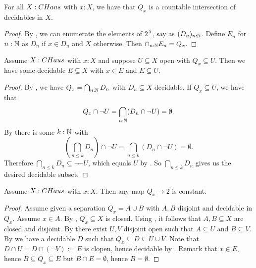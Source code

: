 \begin{lemma}\label{ConnectedComponentClosedInCompactHausdorff}
For all $X:\CHaus$ with $x:X$, we have that $Q_x$ is a countable intersection of decidables in $X$.
\end{lemma}
\begin{proof}
  By ,
  we can enumerate the elements of $2^X$, say as $(D_n)_{n:\mathbb{N}}$. 
  Define $E_n$ for $n:\mathbb{N}$ as $D_n$ if $x\in D_n$ and $X$ otherwise. 
  Then $\cap_{n:\mathbb{N}}E_n = Q_x$.
\end{proof}
%

\begin{lemma}\label{ConnectedComponentSubOpenHasDecidableInbetween}
  Assume $X:\Chaus$ with $x:X$ and suppose $U\subseteq X$ open with $Q_x\subseteq U$. 
  Then we have some decidable $E\subseteq X$ with $x\in E$ and $E\subseteq U$. 
\end{lemma}
\begin{proof}
  By , 
  we have $Q_x = \bigcap_{n:\mathbb{N}}D_n$ with $D_n\subseteq X$ decidable. 
  If $Q_x \subseteq U$, we have that 
  $$Q_x\cap \neg U = \bigcap_{n:\mathbb{N}} (D_n \cap \neg U) = \emptyset.$$
  By  there is some $k:\mathbb{N}$ with 
  $$(\bigcap_{n\leq k} D_n )\cap \neg U  = \bigcap_{n\leq k} (D_n \cap \neg U) = \emptyset.$$
  Therefore $\bigcap_{n\leq k} D_n \subseteq \neg\neg U$, which equals $U$ by . So $\bigcap_{n\leq k} D_n$ gives us the desired decidable subset.
\end{proof}

\begin{lemma}\label{ConnectedComponentConnected}
Assume $X:\Chaus$ with $x:X$. Then any map $Q_x\to 2$ is constant.
\end{lemma}
\begin{proof}
Assume given a separation $Q_x = A\cup B$ with $A,B$ disjoint and decidable in $Q_x$. Assume $x\in A$. 
%
By , $Q_x\subseteq X$ is closed. 
Using , it follows that $A,B\subseteq X$ are closed and disjoint.
By  there exist $U,V$ disjoint open such that $A\subseteq U$ and $B\subseteq V$. 
%
By  we have a decidable $D$ such that $Q_x\subseteq D\subseteq U\cup V$. 
Note that $D\cap U = D \cap (\neg V):=E$ is clopen, hence decidable by .
Remark that $x\in E$, hence $B\subseteq Q_x \subseteq E$ but $B \cap E = \emptyset$, hence $B=\emptyset$. 
%
\end{proof}

